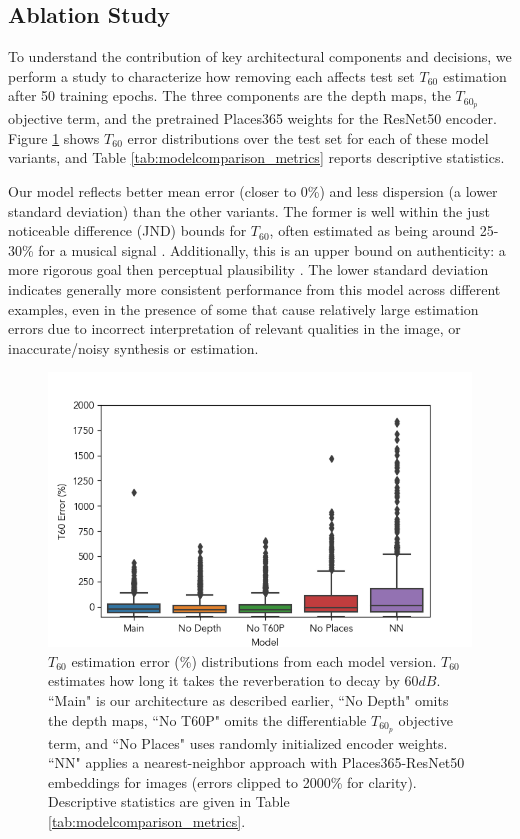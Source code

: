 \documentclass[10pt,twocolumn,letterpaper]{article}
\begin{document}
\subsection{Ablation Study}
To understand the contribution of key architectural components and decisions, we perform a study to characterize how removing each affects test set ${T_{60}}$ estimation after 50 training epochs. The three components are the depth maps, the ${T_{60_p}}$ objective term, and the pretrained Places365 weights for the ResNet50 encoder. Figure \ref{fig:models_comparison} shows ${T_{60}}$ error distributions over the test set for each of these model variants, and Table \ref{tab:modelcomparison_metrics} reports descriptive statistics.

Our model reflects better mean error (closer to 0\%) and less dispersion (a lower standard deviation) than the other variants. The former is well within the just noticeable difference (JND) bounds for ${T_{60}}$, often estimated as being around 25-30\% for a musical signal \cite{jndt60}. Additionally, this is an upper bound on authenticity: a more rigorous goal then perceptual plausibility \cite{pellegrini2001quality}. The lower standard deviation indicates generally more consistent performance from this model across different examples, even in the presence of some that cause relatively large estimation errors due to incorrect interpretation of relevant qualities in the image, or inaccurate/noisy synthesis or estimation.

\begin{figure}
    \centering
    \includegraphics[width=\columnwidth]{t60_errord.png}
    \caption{${T_{60}}$ estimation error (\%) distributions from each model version. ${T_{60}}$ estimates how long it takes the reverberation to decay by $60dB$. ``Main" is our architecture as described earlier, ``No Depth" omits the depth maps, ``No T60P" omits the differentiable ${T_{60_p}}$ objective term, and ``No Places" uses randomly initialized encoder weights. ``NN" applies a nearest-neighbor approach with Places365-ResNet50 embeddings for images (errors clipped to 2000\% for clarity). Descriptive statistics are given in Table \ref{tab:modelcomparison_metrics}.}
    \label{fig:models_comparison}
\end{figure}
\end{document}
